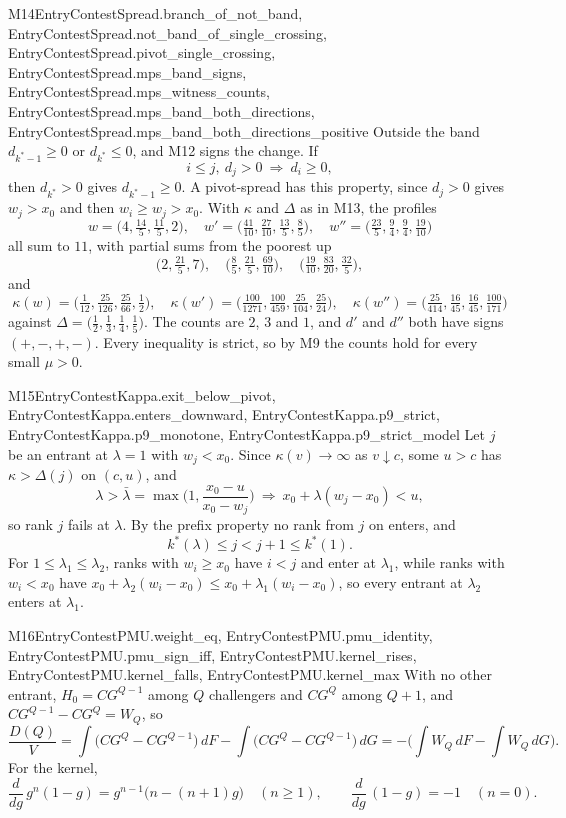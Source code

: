 \begin{mproof}{M14}{EntryContestSpread.branch_of_not_band, EntryContestSpread.not_band_of_single_crossing, EntryContestSpread.pivot_single_crossing, EntryContestSpread.mps_band_signs, EntryContestSpread.mps_witness_counts, EntryContestSpread.mps_band_both_directions, EntryContestSpread.mps_band_both_directions_positive}
Outside the band $d_{k^*-1}\ge0$ or $d_{k^*}\le0$, and M12 signs the change. If
\[
  i\le j,\ d_j>0\ \Rightarrow\ d_i\ge0,
\]
then $d_{k^*}>0$ gives $d_{k^*-1}\ge0$. A pivot-spread has this property, since
$d_j>0$ gives $w_j>x_0$ and then $w_i\ge w_j>x_0$. With $\kappa$ and $\Delta$ as
in M13, the profiles
\[
  w=\big(4,\tfrac{14}{5},\tfrac{11}{5},2\big),\quad
  w'=\big(\tfrac{41}{10},\tfrac{27}{10},\tfrac{13}{5},\tfrac85\big),\quad
  w''=\big(\tfrac{23}5,\tfrac94,\tfrac94,\tfrac{19}{10}\big)
\]
all sum to $11$, with partial sums from the poorest up
\[
  \big(2,\tfrac{21}5,7\big),\quad
  \big(\tfrac85,\tfrac{21}5,\tfrac{69}{10}\big),\quad
  \big(\tfrac{19}{10},\tfrac{83}{20},\tfrac{32}5\big),
\]
and
\[
  \kappa(w)=\big(\tfrac1{12},\tfrac{25}{126},\tfrac{25}{66},\tfrac12\big),\quad
  \kappa(w')=\big(\tfrac{100}{1271},\tfrac{100}{459},\tfrac{25}{104},\tfrac{25}{24}\big),\quad
  \kappa(w'')=\big(\tfrac{25}{414},\tfrac{16}{45},\tfrac{16}{45},\tfrac{100}{171}\big)
\]
against $\Delta=\big(\tfrac12,\tfrac13,\tfrac14,\tfrac15\big)$. The counts are
$2$, $3$ and $1$, and $d'$ and $d''$ both have signs $(+,-,+,-)$. Every
inequality is strict, so by M9 the counts hold for every small $\mu>0$.
\end{mproof}

\begin{mproof}{M15}{EntryContestKappa.exit_below_pivot, EntryContestKappa.enters_downward, EntryContestKappa.p9_strict, EntryContestKappa.p9_monotone, EntryContestKappa.p9_strict_model}
Let $j$ be an entrant at $\lambda=1$ with $w_j<x_0$. Since $\kappa(v)\to\infty$ as
$v\downarrow c$, some $u>c$ has $\kappa>\Delta(j)$ on $(c,u)$, and
\[
  \lambda>\bar\lambda=\max\Big(1,\frac{x_0-u}{x_0-w_j}\Big)
  \ \Rightarrow\ x_0+\lambda(w_j-x_0)<u ,
\]
so rank $j$ fails at $\lambda$. By the prefix property no rank from $j$ on
enters, and
\[
  k^*(\lambda)\le j<j+1\le k^*(1).
\]
For $1\le\lambda_1\le\lambda_2$, ranks with $w_i\ge x_0$ have $i<j$ and enter at
$\lambda_1$, while ranks with $w_i<x_0$ have
$x_0+\lambda_2(w_i-x_0)\le x_0+\lambda_1(w_i-x_0)$, so every entrant at
$\lambda_2$ enters at $\lambda_1$.
\end{mproof}

\begin{mproof}{M16}{EntryContestPMU.weight_eq, EntryContestPMU.pmu_identity, EntryContestPMU.pmu_sign_iff, EntryContestPMU.kernel_rises, EntryContestPMU.kernel_falls, EntryContestPMU.kernel_max}
With no other entrant, $H_0=CG^{Q-1}$ among $Q$ challengers and $CG^{Q}$ among
$Q+1$, and $CG^{Q-1}-CG^{Q}=W_Q$, so
\[
  \frac{D(Q)}V=\int\big(CG^{Q}-CG^{Q-1}\big)\,dF-\int\big(CG^{Q}-CG^{Q-1}\big)\,dG
  =-\Big(\int W_Q\,dF-\int W_Q\,dG\Big).
\]
For the kernel,
\[
  \frac{d}{dg}\,g^n(1-g)=g^{n-1}\big(n-(n+1)g\big)\quad(n\ge1),\qquad
  \frac{d}{dg}\,(1-g)=-1\quad(n=0).
\]
\end{mproof}

